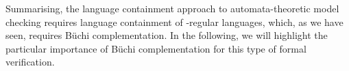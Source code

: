 Summarising, the language containment approach to automata-theoretic model checking requires language containment of \om-regular languages, which, as we have seen, requires Büchi complementation. In the following, we will highlight the particular importance of Büchi complementation for this type of formal verification.






